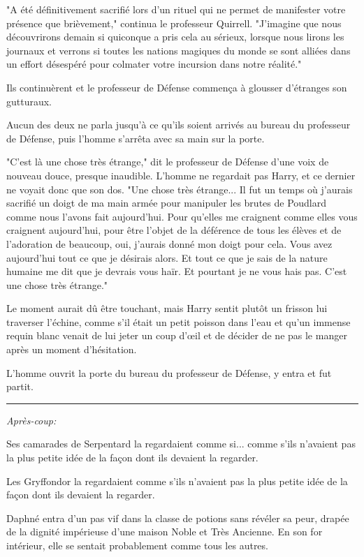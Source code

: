 "A été définitivement sacrifié lors d'un rituel qui ne permet de manifester votre présence que brièvement," continua le professeur Quirrell. "J'imagine que nous découvrirons demain si quiconque a pris cela au sérieux, lorsque nous lirons les journaux et verrons si toutes les nations magiques du monde se sont alliées dans un effort désespéré pour colmater votre incursion dans notre réalité."

Ils continuèrent et le professeur de Défense commença à glousser d'étranges son gutturaux.

Aucun des deux ne parla jusqu'à ce qu'ils soient arrivés au bureau du professeur de Défense, puis l'homme s'arrêta avec sa main sur la porte.

"C'est là une chose très étrange," dit le professeur de Défense d'une voix de nouveau douce, presque inaudible. L'homme ne regardait pas Harry, et ce dernier ne voyait donc que son dos. "Une chose très étrange... Il fut un temps où j'aurais sacrifié un doigt de ma main armée pour manipuler les brutes de Poudlard comme nous l'avons fait aujourd'hui. Pour qu'elles me craignent comme elles vous craignent aujourd'hui, pour être l'objet de la déférence de tous les élèves et de l'adoration de beaucoup, oui, j'aurais donné mon doigt pour cela. Vous avez aujourd'hui tout ce que je désirais alors. Et tout ce que je sais de la nature humaine me dit que je devrais vous haïr. Et pourtant je ne vous hais pas. C'est une chose très étrange."

Le moment aurait dû être touchant, mais Harry sentit plutôt un frisson lui traverser l'échine, comme s'il était un petit poisson dans l'eau et qu'un immense requin blanc venait de lui jeter un coup d'œil et de décider de ne pas le manger après un moment d'hésitation.

L'homme ouvrit la porte du bureau du professeur de Défense, y entra et fut partit.
\par\noindent\rule{\textwidth}{0.4pt}
\emph{Après-coup:} 

Ses camarades de Serpentard la regardaient comme si... comme s'ils n'avaient pas la plus petite idée de la façon dont ils devaient la regarder.

Les Gryffondor la regardaient comme s'ils n'avaient pas la plus petite idée de la façon dont ils devaient la regarder.

Daphné entra d'un pas vif dans la classe de potions sans révéler sa peur, drapée de la dignité impérieuse d'une maison Noble et Très Ancienne. En son for intérieur, elle se sentait probablement comme tous les autres.

